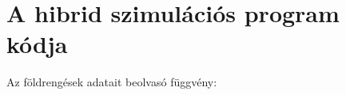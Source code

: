\chapter{A hibrid szimulációs program kódja}\label{chap: függ hibrid prog}


 
 

 
 
 
 
 
 
 
 
 Az  földrengések adatait beolvasó függvény:
 

 